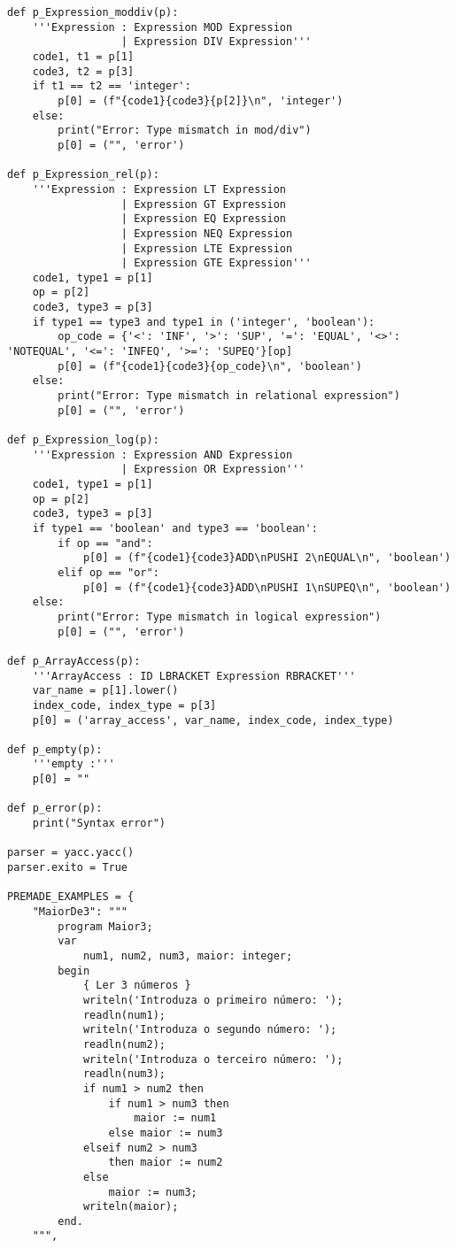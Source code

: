\documentclass[12pt,a4paper]{report}%
\begin{document}
\begin{lstlisting}[style=pythonStyle, caption={Ficheiro lex.py}]
def p_Expression_moddiv(p):
    '''Expression : Expression MOD Expression
                  | Expression DIV Expression'''
    code1, t1 = p[1]
    code3, t2 = p[3]
    if t1 == t2 == 'integer':
        p[0] = (f"{code1}{code3}{p[2]}\n", 'integer')
    else:
        print("Error: Type mismatch in mod/div")
        p[0] = ("", 'error')

def p_Expression_rel(p):
    '''Expression : Expression LT Expression
                  | Expression GT Expression
                  | Expression EQ Expression
                  | Expression NEQ Expression
                  | Expression LTE Expression
                  | Expression GTE Expression'''
    code1, type1 = p[1]
    op = p[2]
    code3, type3 = p[3]
    if type1 == type3 and type1 in ('integer', 'boolean'):
        op_code = {'<': 'INF', '>': 'SUP', '=': 'EQUAL', '<>': 'NOTEQUAL', '<=': 'INFEQ', '>=': 'SUPEQ'}[op]
        p[0] = (f"{code1}{code3}{op_code}\n", 'boolean')
    else:
        print("Error: Type mismatch in relational expression")
        p[0] = ("", 'error')

def p_Expression_log(p):
    '''Expression : Expression AND Expression
                  | Expression OR Expression'''
    code1, type1 = p[1]
    op = p[2]
    code3, type3 = p[3]
    if type1 == 'boolean' and type3 == 'boolean':
        if op == "and":
            p[0] = (f"{code1}{code3}ADD\nPUSHI 2\nEQUAL\n", 'boolean')
        elif op == "or":
            p[0] = (f"{code1}{code3}ADD\nPUSHI 1\nSUPEQ\n", 'boolean')
    else:
        print("Error: Type mismatch in logical expression")
        p[0] = ("", 'error')

def p_ArrayAccess(p):
    '''ArrayAccess : ID LBRACKET Expression RBRACKET'''
    var_name = p[1].lower()
    index_code, index_type = p[3]
    p[0] = ('array_access', var_name, index_code, index_type)

def p_empty(p):
    '''empty :'''
    p[0] = ""

def p_error(p):
    print("Syntax error")

parser = yacc.yacc()
parser.exito = True

PREMADE_EXAMPLES = {
    "MaiorDe3": """
        program Maior3;
        var  
            num1, num2, num3, maior: integer;
        begin
            { Ler 3 números }
            writeln('Introduza o primeiro número: ');  
            readln(num1);
            writeln('Introduza o segundo número: ');  
            readln(num2);
            writeln('Introduza o terceiro número: ');  
            readln(num3);
            if num1 > num2 then
                if num1 > num3 then 
                    maior := num1
                else maior := num3
            elseif num2 > num3 
                then maior := num2
            else 
                maior := num3;
            writeln(maior);
        end.
    """,


\end{lstlisting}
\end{document}
